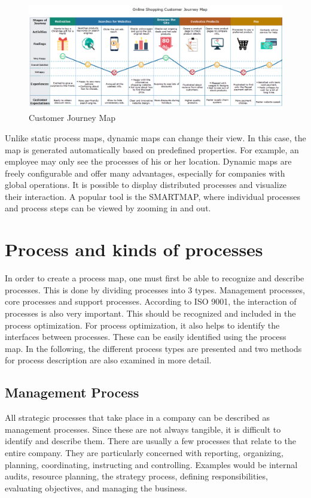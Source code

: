 \documentclass[11pt,a4paper]{article}
\begin{document}
\begin{figure}[h] 
  \centering
     \includegraphics[width=\textwidth]{customer-journey-map.png}
  \caption{Customer Journey Map \cite{8}}
  \label{customer}
\end{figure}

Unlike static process maps, dynamic maps can change their view. In this case,
the map is generated automatically based on predefined properties. For
example, an employee may only see the processes of his or her location.
Dynamic maps are freely configurable and offer many advantages, especially for
companies with global operations. It is possible to display distributed
processes and visualize their interaction. A popular tool is the SMARTMAP,
where individual processes and process steps can be viewed by zooming in and
out.

\section{Process and kinds of processes}\label{sec:process}

In order to create a process map, one must first be able to recognize and
describe processes. This is done by dividing processes into 3
types. Management processes, core processes and support processes. According
to ISO 9001, the interaction of processes is also very important. This should
be recognized and included in the process optimization. For process
optimization, it also helps to identify the interfaces between processes.
These can be easily identified using the process map. In the following, the
different process types are presented and two methods for process description
are also examined in more detail.

\subsection{Management Process}

All strategic processes that take place in a company can be described as
management processes. Since these are not always tangible, it is difficult to
identify and describe them. There are usually a few processes that relate to
the entire company. They are particularly concerned with reporting,
organizing, planning, coordinating, instructing and controlling. Examples
would be internal audits, resource planning, the strategy process, defining
responsibilities, evaluating objectives, and managing the business.
\end{document}
